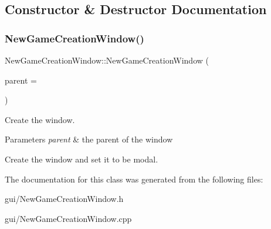 \subsection{Constructor \& Destructor Documentation}
\mbox{\label{classNewGameCreationWindow_a1b8cd9166289a086a951c2ee9d6bfebe}} 
\subsubsection{\texorpdfstring{New\+Game\+Creation\+Window()}{NewGameCreationWindow()}}
{\footnotesize\ttfamily New\+Game\+Creation\+Window\+::\+New\+Game\+Creation\+Window (\begin{DoxyParamCaption}\item[{Q\+Widget $\ast$}]{parent = {} }\end{DoxyParamCaption})}



Create the window. 


\begin{DoxyParams}{Parameters}
{\em parent} & the parent of the window\\
\hline
\end{DoxyParams}
Create the window and set it to be modal. 

The documentation for this class was generated from the following files\+:\begin{DoxyCompactItemize}
\item 
gui/New\+Game\+Creation\+Window.\+h\item 
gui/New\+Game\+Creation\+Window.\+cpp\end{DoxyCompactItemize}
